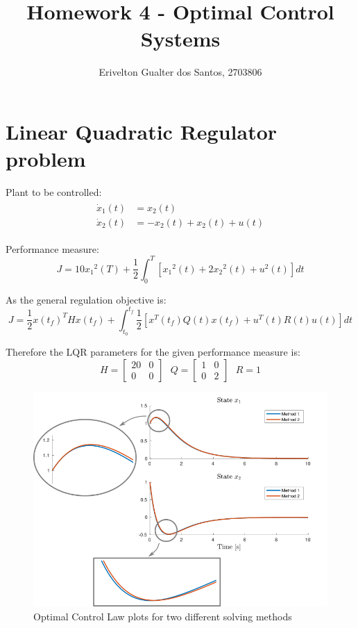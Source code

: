\documentclass{article}
\begin{document}
\title{Homework 4 - Optimal Control Systems}
\author{Erivelton Gualter dos Santos, 2703806}
\date{}

\maketitle 

\section{Linear Quadratic Regulator problem}

Plant to be controlled: 
\begin{eqnarray}\label{i1}
\begin{split}
	\dot{x}_1(t) &= x_2(t) \\
	\dot{x}_2(t) &= -x_2(t) + x_2(t) + u(t)
\end{split}
\end{eqnarray}

Performance measure:
\begin{equation}
J = 10{x_ 1}^2(T) + \frac{1}{2}\int_{0}^{T} \left[ {x_ 1}^2(t) + 2{x_ 2}^2(t) + u^2(t)\right] dt
\end{equation}

As the general regulation objective is:
\begin{equation}
J = \frac{1}{2}{x(t_f)}^THx(t_f) + \int_{t_0}^{t_f} \frac{1}{2}\left[ {x^T(t_f)}Q(t)x(t_f) + {u^T(t)}R(t)u(t) \right] dt
\end{equation}

Therefore the LQR parameters for the given performance measure is:
\begin{equation*}
H = 
\begin{bmatrix}
20  & 0 \\
0 & 0
\end{bmatrix}
\:\:\: 
Q = 
\begin{bmatrix}
1 & 0 \\
0 & 2
\end{bmatrix}
\:\:\: 
R = 1
\end{equation*}

\begin{center} \begin{figure} 
\includegraphics [width=4.5in]{states.png}
\caption{Optimal Control Law plots for two different solving methods}
\end{figure}  \end{center}
\end{document}
